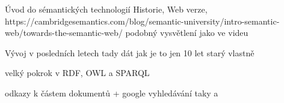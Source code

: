 \chap Úvod do sémantických technologií
	\sec Historie, Web verze,
	https://cambridgesemantics.com/blog/semantic-university/intro-semantic-web/towards-the-semantic-web/ podobný vysvětlení jako ve videu

	\sec Vývoj v posledních letech
	tady dát jak je to jen 10 let starý vlastně

	velký pokrok v RDF, OWL a SPARQL

	odkazy k částem dokumentů + google vyhledávání taky a 